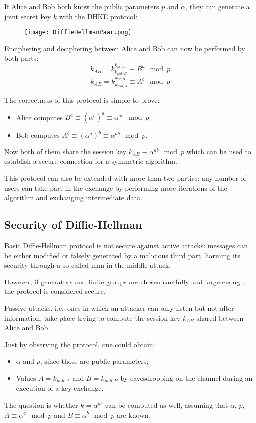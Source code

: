 If Alice and Bob both know the public parameters $p$ and $\alpha$, they can generate a joint secret key $k$ with the DHKE protocol:

\begin{figure}[h]
	\texttt{[image: DiffieHellmanPaar.png]}
	\centering
\end{figure}

Enciphering and deciphering between Alice and Bob can now be performed by both parts:
$$k_{AB} = k^{k_{pr, A}}_{k_{pub, B}} \equiv B^a \mod p$$
$$k_{AB} = k^{k_{pr, B}}_{k_{pub, A}} \equiv A^b \mod p$$

The correctness of this protocol is simple to prove: 
\begin{itemize}
	\item Alice computes $B^a \equiv (\alpha^b)^a \equiv \alpha^{ab} \mod p$;
	\item Bob computes $A^b \equiv (\alpha^a)^b \equiv \alpha^{ab} \mod p$.
\end{itemize}
Now both of them share the session key $k_{AB} \equiv \alpha^{ab} \mod p$ which can be used to establish a secure connection for a symmetric algorithm. 

This protocol can also be extended with more than two parties: any number of users can take part in the exchange by performing more iterations of the algorithm and exchanging intermediate data.

\subsection{Security of Diffie-Hellman}
Basic Diffie-Hellman protocol is not secure against active attacks: messages can be either modified or falsely generated by a malicious third part, harming its security through a so called man-in-the-middle attack. 

However, if generators and finite groups are chosen carefully and large enough, the protocol is considered secure. 

Passive attacks. i.e.\ ones in which an attacker can only listen but not alter information, take place trying to compute the session key $k_{AB}$ shared between Alice and Bob. 

Just by observing the protocol, one could obtain:
\begin{itemize}
	\item $\alpha$ and $p$, since those are public parameters;
	\item Values $A = k_{pub, A}$ and $B = k_{pub, B}$ by eavesdropping on the channel during an execution of a key exchange.
\end{itemize}
The question is whether $k = \alpha^{ab}$ can be computed as well, assuming that $\alpha$, $p$, $A \equiv \alpha^a \mod p$ and $B \equiv \alpha^b \mod p$ are known.

